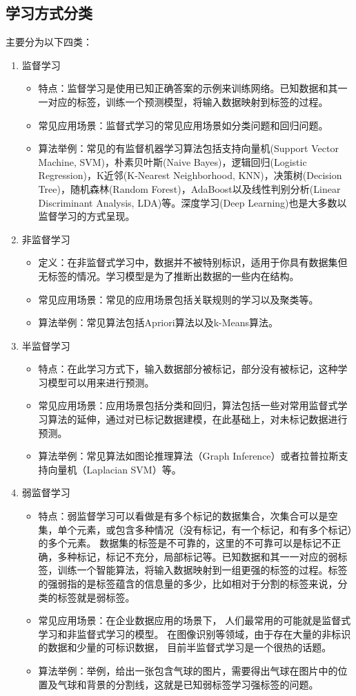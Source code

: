 \documentclass[UTF8]{ctexart}
\begin{document}
\subsection{学习方式分类}
主要分为以下四类：
\begin{enumerate}
	\item 监督学习 \begin{itemize}
		\item 特点：监督学习是使用已知正确答案的示例来训练网络。已知数据和其一一对应的标签，训练一个预测模型，将输入数据映射到标签的过程。
		\item 常见应用场景：监督式学习的常见应用场景如分类问题和回归问题。
		\item 算法举例：常见的有监督机器学习算法包括支持向量机(Support Vector Machine, SVM)，朴素贝叶斯(Naive Bayes)，逻辑回归(Logistic Regression)，K近邻(K-Nearest Neighborhood, KNN)，决策树(Decision Tree)，随机森林(Random Forest)，AdaBoost以及线性判别分析(Linear Discriminant Analysis, LDA)等。深度学习(Deep Learning)也是大多数以监督学习的方式呈现。
	\end{itemize}
	\item 非监督学习 \begin{itemize}
		\item 定义：在非监督式学习中，数据并不被特别标识，适用于你具有数据集但无标签的情况。学习模型是为了推断出数据的一些内在结构。
		\item 常见应用场景：常见的应用场景包括关联规则的学习以及聚类等。
		\item 算法举例：常见算法包括Apriori算法以及k-Means算法。
	\end{itemize}
	\item 半监督学习 \begin{itemize}
		\item 特点：在此学习方式下，输入数据部分被标记，部分没有被标记，这种学习模型可以用来进行预测。
		\item 常见应用场景：应用场景包括分类和回归，算法包括一些对常用监督式学习算法的延伸，通过对已标记数据建模，在此基础上，对未标记数据进行预测。
		\item 算法举例：常见算法如图论推理算法（Graph Inference）或者拉普拉斯支持向量机（Laplacian SVM）等。
	\end{itemize}
	\item 弱监督学习 \begin{itemize}
		\item 特点：弱监督学习可以看做是有多个标记的数据集合，次集合可以是空集，单个元素，或包含多种情况（没有标记，有一个标记，和有多个标记）的多个元素。 数据集的标签是不可靠的，这里的不可靠可以是标记不正确，多种标记，标记不充分，局部标记等。已知数据和其一一对应的弱标签，训练一个智能算法，将输入数据映射到一组更强的标签的过程。标签的强弱指的是标签蕴含的信息量的多少，比如相对于分割的标签来说，分类的标签就是弱标签。
		\item 常见应用场景：在企业数据应用的场景下， 人们最常用的可能就是监督式学习和非监督式学习的模型。 在图像识别等领域，由于存在大量的非标识的数据和少量的可标识数据， 目前半监督式学习是一个很热的话题。
		\item 算法举例：举例，给出一张包含气球的图片，需要得出气球在图片中的位置及气球和背景的分割线，这就是已知弱标签学习强标签的问题。
	\end{itemize}
\end{enumerate}
\end{document}
